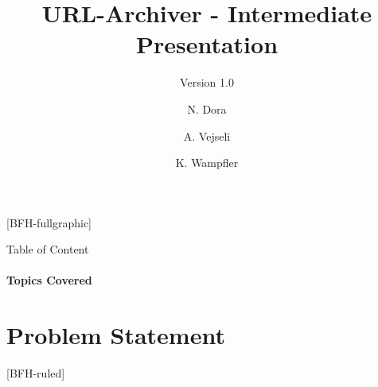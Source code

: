 \documentclass[
    ngerman,%
    authorontitle=true,
]{bfhbeamer}
\title{URL-Archiver - Intermediate Presentation}
\subtitle{Version 1.0}
\author[N. Dora \and A. Vejseli \and K. Wampfler]{N. Dora \and A. Vejseli \and K. Wampfler}
\institute{School of Engineering and Computer Science}
\begin{document}

    [BFH-fullgraphic]
    \maketitle



    \begin{frame}{Table of Content}
        \framesubtitle{Topics Covered}
        \tableofcontents
    \end{frame}



    \section{Problem Statement}
    [BFH-ruled]
    \frame{\sectionpage}
\end{document}
